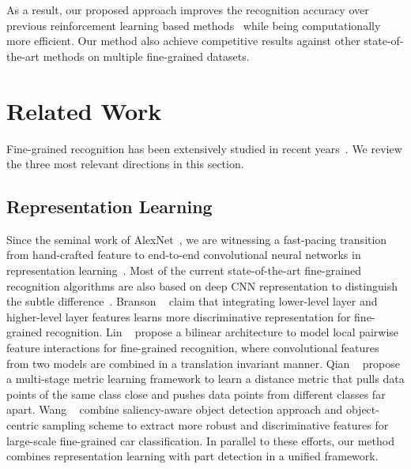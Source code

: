 \documentclass[10pt,twocolumn,letterpaper]{article}
\begin{document}
As a result, our proposed approach improves the recognition accuracy over previous reinforcement learning based methods~\cite{mnih2014recurrent, sermanet2014attention} while being computationally more efficient.
Our method also achieve competitive results against other state-of-the-art methods on multiple fine-grained datasets.


\section{Related Work}
Fine-grained recognition has been extensively studied in recent years~\cite{bossard2014food, berg2014birdsnap, cui2016fine, huang2016part, krause2015fine, krause20133d, khosla2011novel, liu2012dog, nilsback2008automated}.
We review the three most relevant directions in this section.

\subsection{Representation Learning}
Since the seminal work of AlexNet~\cite{krizhevsky2012imagenet}, we are witnessing a fast-pacing transition from hand-crafted feature to end-to-end convolutional neural networks in representation learning~\cite{simonyan2014very, szegedy2015going, he2016deep}.
Most of the current state-of-the-art fine-grained recognition algorithms are also based on deep CNN representation to distinguish the subtle difference~\cite{gao2016compact, kong2016low, lin2015bilinear}.
Branson \etal~\cite{branson2014bird} claim that integrating lower-level layer and higher-level layer features learns more discriminative representation for fine-grained recognition.
Lin \etal~\cite{lin2015bilinear} propose a bilinear architecture to model local pairwise feature interactions for fine-grained recognition, where convolutional features from two models are combined in a translation invariant manner.
Qian \etal~\cite{qian2015fine} propose a multi-stage metric learning framework to learn a distance metric that pulls data points of the same class close and pushes data points from different classes far apart.
Wang \etal~\cite{wang2014object} combine saliency-aware object detection approach and object-centric sampling scheme to extract more robust and discriminative features for large-scale fine-grained car classification.
In parallel to these efforts, our method combines representation learning with part detection in a unified framework.
\end{document}
